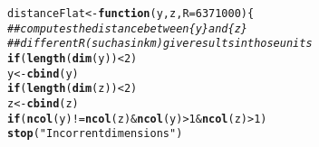 \documentclass[11pt]{article}\usepackage[]{graphicx}\usepackage[]{color}
\makeatletter
\newcommand{\hlnum}[1]{\textcolor[rgb]{0.686,0.059,0.569}{#1}}%
\newcommand{\hlstr}[1]{\textcolor[rgb]{0.192,0.494,0.8}{#1}}%
\newcommand{\hlcom}[1]{\textcolor[rgb]{0.678,0.584,0.686}{\textit{#1}}}%
\newcommand{\hlopt}[1]{\textcolor[rgb]{0,0,0}{#1}}%
\newcommand{\hlstd}[1]{\textcolor[rgb]{0.345,0.345,0.345}{#1}}%
\newcommand{\hlkwa}[1]{\textcolor[rgb]{0.161,0.373,0.58}{\textbf{#1}}}%
\newcommand{\hlkwb}[1]{\textcolor[rgb]{0.69,0.353,0.396}{#1}}%
\newcommand{\hlkwc}[1]{\textcolor[rgb]{0.333,0.667,0.333}{#1}}%
\newcommand{\hlkwd}[1]{\textcolor[rgb]{0.737,0.353,0.396}{\textbf{#1}}}%
\newenvironment{kframe}{%
 \def\at@end@of@kframe{}%
 \ifinner\ifhmode%
  \def\at@end@of@kframe{\end{minipage}}%
  \begin{minipage}{\columnwidth}%
 \fi\fi%
 \def\FrameCommand##1{\hskip\@totalleftmargin \hskip-\fboxsep
 \colorbox{shadecolor}{##1}\hskip-\fboxsep
     \hskip-\linewidth \hskip-\@totalleftmargin \hskip\columnwidth}%
 \MakeFramed {\advance\hsize-\width
   \@totalleftmargin\z@ \linewidth\hsize
   \@setminipage}}%
 {\par\unskip\endMakeFramed%
 \at@end@of@kframe}
\newenvironment{knitrout}{}{} %
\makeatother
\begin{document}
\begin{knitrout}
\color{fgcolor}\begin{kframe}
\begin{alltt}
\hlstd{distanceFlat} \hlkwb{<-} \hlkwa{function}\hlstd{(}\hlkwc{y}\hlstd{,} \hlkwc{z}\hlstd{,} \hlkwc{R} \hlstd{=} \hlnum{6371000}\hlstd{) \{}
    \hlcom{## computes the distance between \{y\} and \{z\}}
    \hlcom{## different R (such as in km) give results in those units}
    \hlkwa{if} \hlstd{(}\hlkwd{length}\hlstd{(}\hlkwd{dim}\hlstd{(y))} \hlopt{<} \hlnum{2}\hlstd{)}
        \hlstd{y} \hlkwb{<-} \hlkwd{cbind}\hlstd{(y)}
    \hlkwa{if} \hlstd{(}\hlkwd{length}\hlstd{(}\hlkwd{dim}\hlstd{(z))} \hlopt{<} \hlnum{2}\hlstd{)}
        \hlstd{z} \hlkwb{<-} \hlkwd{cbind}\hlstd{(z)}
    \hlkwa{if} \hlstd{(}\hlkwd{ncol}\hlstd{(y)} \hlopt{!=} \hlkwd{ncol}\hlstd{(z)} \hlopt{&} \hlkwd{ncol}\hlstd{(y)} \hlopt{>} \hlnum{1} \hlopt{&} \hlkwd{ncol}\hlstd{(z)} \hlopt{>} \hlnum{1}\hlstd{)}
        \hlkwd{stop}\hlstd{(}\hlstr{"Incorrent dimensions"}\hlstd{)}


\end{alltt}
\end{kframe}
\end{knitrout}
\end{document}
